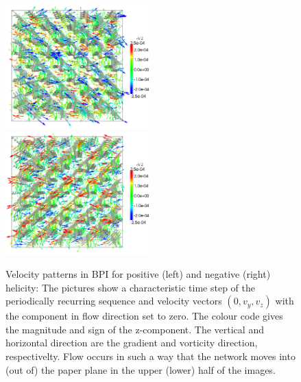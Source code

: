 \documentclass[aps,pre,reprint,superscriptaddress]{revtex4}
\begin{document}
\begin{figure}[h]
\includegraphics[width=0.495\textwidth]{v_yz-v_z-360k_run914.png}
\includegraphics[width=0.495\textwidth]{v_yz-v_z-360k_run922.png}
\caption{Velocity patterns in BPI for positive (left) and negative (right) helicity: The pictures show a characteristic time step of the periodically recurring sequence and velocity vectors $(0,v_y,v_z)$ with the component in flow direction set to zero. The colour code gives the magnitude and sign of the z-component. The vertical and horizontal direction are the gradient and vorticity direction, respectivelty. Flow occurs in such a way that the network moves into (out of) the paper plane in the upper (lower) half of the images.}
\label{bp1-velo}
\end{figure}
\end{document}
